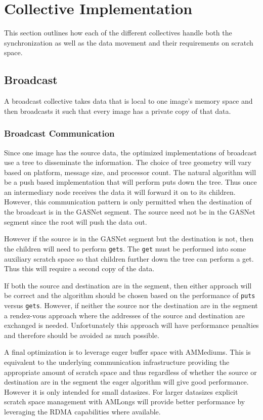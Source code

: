 \documentclass[times,10pt]{article}
\begin{document}
\section{Collective Implementation}
This section outlines how each of the different collectives handle both the synchronization as well as the
 data movement and their requirements on scratch space.

\subsection{Broadcast} 

A broadcast collective  takes data that is local  to one image's memory space and then broadcasts it 
such that every image has a private copy of that data. 

\subsubsection{Broadcast Communication}
Since one image has the source data, the optimized implementations of broadcast use a tree to 
disseminate the information. The choice of tree geometry will vary based on platform, message size, and 
processor count. The natural algorithm will be a push based implementation that will perform puts down the tree. Thus once an intermediary node receives the data it will forward it on to its children. However, this communication pattern is only permitted when the destination of the broadcast is in the GASNet segment. The source need not be in the GASNet segment since the root will push the data out. 

However if the source is in the GASNet segment but the destination is not, then the children will need to perform \texttt{gets}. The \texttt{get} must be performed into some auxiliary scratch space so that children further down the tree can perform a get. Thus this will require a second copy of the data.

If both the source and destination are in the segment, then either approach will be correct and the algorithm should be chosen based on the performance of \texttt{puts} versus \texttt{gets}. However, if neither the source nor the destination are in the segment a rendez-vous approach where the addresses of the source and destination are exchanged is needed. Unfortunately this approach will have performance penalties and therefore should be avoided as much possible. 

A final optimization is to leverage eager buffer space with AMMediums. This is equivalent to the underlying communication infrastructure providing the appropriate amount of scratch space and thus regardless of whether the source or destination are in the segment the eager algorithm will give good performance. However it is only intended for small datasizes. For larger datasizes explicit scratch space management with AMLongs will provide better performance by leveraging the RDMA capabilities where available. 
\end{document}
